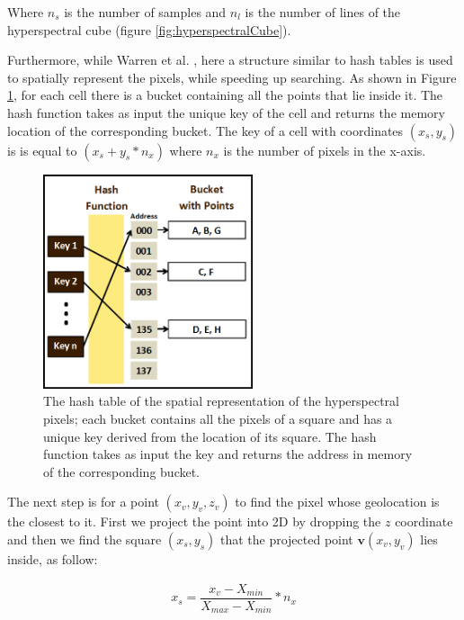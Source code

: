 \documentclass{subfiles}
\begin{document}
	\par Where $n_s$  is  the number of samples and $n_l$ is the number of lines of the hyperspectral cube (figure \ref{fig:hyperspectralCube}).
	
	\par {\color{blue}Furthermore, while Warren et al. \cite{Warren2014}, here a structure similar to hash tables is used to spatially represent the pixels, while speeding up searching. As shown in Figure \ref{fig:HashTable}, for each cell there is a bucket containing all the points that lie inside it. The hash function takes as input the unique key of the cell and returns the memory location of the corresponding bucket. The key of a cell with coordinates $(x_s,y_s)$ is is equal to $(x_s + y_s *n_x)$ where $n_x$ is the number of pixels in the x-axis.}
	
	 \begin{figure} [h!]
	 	\centering
	 	\includegraphics[width=0.55\textwidth]{img/HashTable}
	 	\caption[Hash Table]{The hash table of the spatial representation of the hyperspectral pixels; each bucket contains all the pixels of a square and  has a unique key derived from the location of its square. The hash function takes as input the key and returns the address in memory of the corresponding bucket. }
	 	\label{fig:HashTable}
	 \end{figure}
	
	\par The next step is for a point $(x_v, y_v, z_v)$ to find the pixel whose geolocation is the closest to it. First we project the point into 2D by dropping the $z$ coordinate and then we find the square $(x_s , y_s )$ that the projected point $\mathbf{v}(x_v , y_v)$ lies inside, as follow: 
	
    \begin{eqnarray}
	    x_s = \dfrac{x_v-X_{min}}{X_{max}-X_{min}} * n_x
    \end{eqnarray}
	
\end{document}
